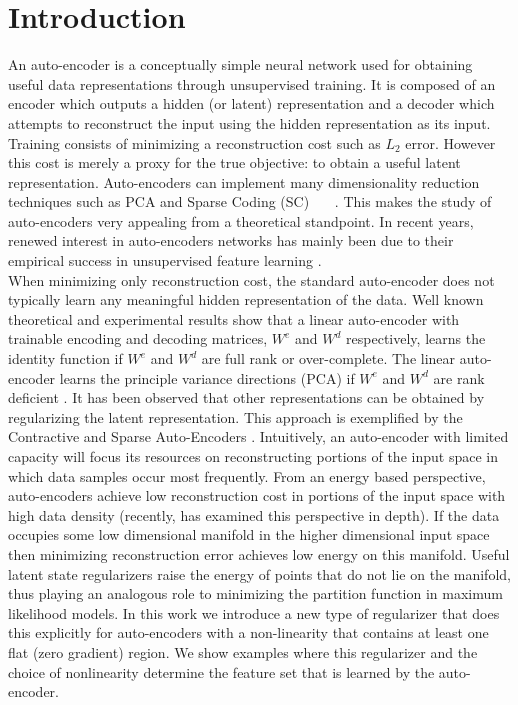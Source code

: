 
\section{Introduction} An auto-encoder is a conceptually simple
neural network used for obtaining useful data representations through
unsupervised training. It is composed of an encoder which outputs a hidden (or
latent) representation and a decoder which attempts to reconstruct the input
using the hidden representation as its input. Training consists of minimizing a
reconstruction cost such as $L_2$ error. However this cost is merely a proxy
for the true objective: to obtain a useful latent representation. Auto-encoders
can  implement many dimensionality reduction techniques such as PCA and Sparse
Coding (SC) ~\cite{DHS}~\cite{SC}~\cite{LISTA}. This makes the study of
auto-encoders very appealing from a theoretical standpoint. In recent years,
renewed interest in auto-encoders networks has mainly been due to their
empirical success in unsupervised feature learning
\cite{SAE1}\cite{SAE2}\cite{CAE}\cite{DAE}. \\

\noindent When minimizing only reconstruction cost, the standard auto-encoder
does not typically learn any meaningful hidden representation of the data. Well
known theoretical and experimental results show that a linear auto-encoder with
trainable encoding and decoding matrices, $W^e$ and $W^d$ respectively, learns
the identity function if $W^e$ and $W^d$ are full rank or over-complete. The
linear auto-encoder learns the principle variance directions (PCA) if $W^e$ and
$W^d$ are rank deficient \cite{DHS}. It has been observed that other
representations can be obtained by regularizing the latent representation. This
approach is exemplified by the Contractive and Sparse Auto-Encoders \cite{CAE}
\cite{SAE1} \cite{SAE2}. Intuitively, an auto-encoder with limited capacity
will focus its resources on reconstructing portions of the input space in which
data samples occur most frequently. From an energy based perspective,
auto-encoders achieve low reconstruction cost in portions of the input space
with high data density (recently, \cite{bengio_new} has examined this
perspective in depth). If the data occupies some low dimensional manifold in
the higher dimensional input space then minimizing reconstruction error
achieves low energy on this manifold. Useful latent state regularizers raise
the energy of points that do not lie on the manifold, thus playing an analogous
role to minimizing the partition function in maximum likelihood models. In this
work we introduce a new type of regularizer that does this explicitly for
auto-encoders with a non-linearity that contains at least one flat (zero
gradient) region. We show examples where this regularizer and the choice of
nonlinearity determine the feature set that is learned by the auto-encoder.      

